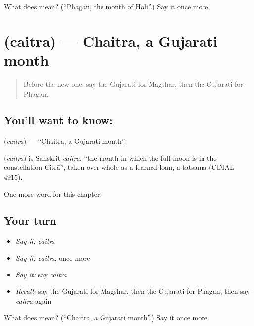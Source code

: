 \begin{tcolorbox}[breakable,colback=teal!4,colframe=teal!35!black,title={Before you move on}]
What does  mean? (\textquotedblleft{}Phagan, the month of Holi\textquotedblright{}.) Say it once more.
\end{tcolorbox}
\section[\texorpdfstring{\gu{ચૈત્ર} (caitra)}{ચૈત્ર (caitra)}]{ (caitra) — Chaitra, a Gujarati month}

\label{lesson:GU-C97-caitra}



\begin{quote}
Before the new one: say the Gujarati for Magshar, then the Gujarati for Phagan.
\end{quote}

\subsection*{You'll want to know: }
\textbf{} (\emph{caitra}) — \textquotedblleft{}Chaitra, a Gujarati month\textquotedblright{}.

\begin{cousinweb}
\textbf{} (\emph{caitra}) is Sanskrit \emph{caitra}, \textquotedblleft{}the month in which the full moon is in the constellation Citrā\textquotedblright{}, taken over whole as a learned loan, a tatsama (CDIAL 4915).
\end{cousinweb}

\begin{grammarlens}[title={What you've built}]
One more word for this chapter.
\end{grammarlens}

\subsection*{Your turn}
\begin{itemize}
\raggedright
  \item \emph{Say it:} \emph{caitra}
  \item \emph{Say it:} \emph{caitra}, once more
  \item \emph{Say it:} say \emph{caitra}
  \item \emph{Recall:} say the Gujarati for Magshar, then the Gujarati for Phagan, then say \emph{caitra} again
\end{itemize}

\begin{tcolorbox}[breakable,colback=teal!4,colframe=teal!35!black,title={Before you move on}]
What does  mean? (\textquotedblleft{}Chaitra, a Gujarati month\textquotedblright{}.) Say it once more.
\end{tcolorbox}
